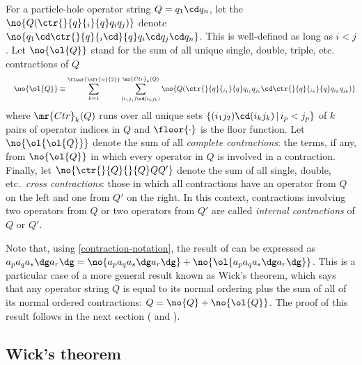 \documentclass[11pt,fleqn]{article}
\numberwithin{equation}{section}
\begin{document}
\begin{ntt}\label{contraction-notation}
For a particle-hole operator string $Q=q_1\cd q_n$, let the $\no{Q(\ctr{}{q}{_i}{q}q_iq_j)}$ denote $\no{q_1\cd\ctr{}{q}{_i\cd}{q}q_i\cd q_j\cd q_n}$.
This is well-defined as long as $i<j$.
Let $\no{\ol{Q}}$ stand for the sum of all unique single, double, triple, etc. contractions of $Q$
\begin{align*}
&&
  \no{\ol{Q}}
\equiv
  \sum_{k=1}^{\floor{\sfr{n}{2}}}
  \sum_{(i_1j_1)\cd(i_kj_k)}^{\mr{Ctr}_k(Q)}
  \no{Q(
    \ctr{}{q}{_{i_1}}{q}
    q_{i_1}q_{j_1}
    \cd
    \ctr{}{q}{_{i_k}}{q}
    q_{i_k}q_{j_k}
  )}
\end{align*}
where $\mr{Ctr}_k(Q)$ runs over all unique sets $\{(i_1j_2)\cd(i_kj_k)\,|\,i_p<j_p\}$ of $k$ pairs of operator indices in $Q$ and $\floor{\cdot}$ is the floor function.
Let $\no{\ol{\ol{Q}}}$ denote the sum of all \textit{complete contractions}: the terms, if any, from $\no{\ol{Q}}$ in which every operator in $Q$ is involved in a contraction.
Finally, let $\no{\ctr{}{Q}{}{Q} QQ'}$ denote the sum of all single, double, etc.~\textit{cross contractions}: those in which all contractions have an operator from $Q$ on the left and one from $Q'$ on the right.
In this context, contractions involving two operators from $Q$ or two operators from $Q'$ are called \textit{internal contractions} of $Q$ or $Q'$.
\end{ntt}

\begin{rmk}
Note that, using \cref{contraction-notation}, the result of  can be expressed as $a_pa_qa_s\dg a_r\dg=\no{a_pa_qa_s\dg a_r\dg}+\no{\ol{a_pa_qa_s\dg a_r\dg}}$.
This is a particular case of a more general result known as Wick's theorem, which says that any operator string $Q$ is equal to its normal ordering plus the sum of all of its normal ordered contractions: $Q=\no{Q}+\no{\ol{Q}}$.
The proof of this result follows in the next section ( and ).
\end{rmk}

\subsection{Wick's theorem}
\end{document}
